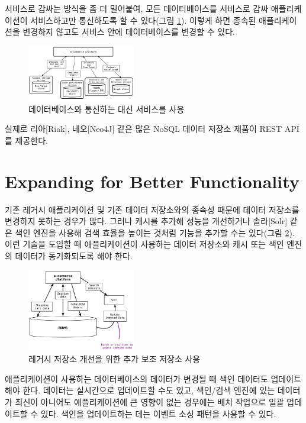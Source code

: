 \documentclass[twocolumn]{article}
\begin{document}
서비스로 감싸는 방식을 좀 더 밀어붙여, 모든 데이터베이스를 서비스로 감싸 애플리케이션이 서비스하고만 통신하도록 할 수 있다(그림 \ref{fig05}). 이렇게 하면 종속된 애플리케이션을 변경하지 않고도 서비스 안에 데이터베이스를 변경할 수 있다.

\begin{figure}[htb]
        \centering
        \includegraphics[width=0.42\textwidth]{services}
        \caption{데이터베이스와 통신하는 대신 서비스를 사용}
        \label{fig05}
\end{figure}

실제로 리아[Riak], 네오[Neo4J] 같은 많은 NoSQL 데이터 저장소 제품이 REST API를 제공한다.



\section{Expanding for Better Functionality}
기존 레거시 애플리케이션 및 기존 데이터 저장소와의 종속성 때문에 데이터 저장소를 변경하지 못하는 경우가 많다. 그러나 캐시를 추가해 성능을 개선하거나 솔라[Solr] 같은 색인 엔진을 사용해 검색 효율을 높이는 것처럼 기능을 추가할 수는 있다(그림 \ref{fig06}). 이런 기술을 도입할 때 애플리케이션이 사용하는 데이터 저장소와 캐시 또는 색인 엔진의 데이터가 동기화되도록 해야 한다.

\begin{figure}[htb]
        \centering
        \includegraphics[width=0.42\textwidth]{storage}
        \caption{레거시 저장소 개선을 위한 추가 보조 저장소 사용}
        \label{fig06}
\end{figure}

애플리케이션이 사용하는 데이터베이스의 데이터가 변경될 때 색인 데이터도 업데이트해야 한다. 데이터는 실시간으로 업데이트할 수도 있고, 색인/검색 엔진에 있는 데이터가 최신이 아니어도 애플리케이션에 큰 영향이 없는 경우에는 배치 작업으로 일괄 업데이트할 수 있다. 색인을 업데이트하는 데는 이벤트 소싱 패턴을 사용할 수 있다.
\end{document}
